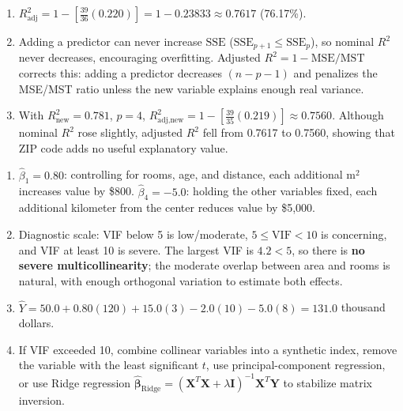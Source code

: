 \begin{solproblema}[prob:9f8863e]
\begin{enumerate}
\item $R_{\text{adj}}^2=1-\left[\frac{39}{36}(0.220)\right]=1-0.23833\approx0.7617$ (76.17\%).
\item Adding a predictor can never increase $\text{SSE}$ ($\text{SSE}_{p+1}\le\text{SSE}_p$), so nominal $R^2$ never decreases, encouraging overfitting. Adjusted $R^2=1-\text{MSE}/\text{MST}$ corrects this: adding a predictor decreases $(n-p-1)$ and penalizes the MSE/MST ratio unless the new variable explains enough real variance.
\item With $R^2_{\text{new}}=0.781$, $p=4$, $R_{\text{adj,new}}^2=1-\left[\frac{39}{35}(0.219)\right]\approx0.7560$. Although nominal $R^2$ rose slightly, adjusted $R^2$ fell from 0.7617 to 0.7560, showing that ZIP code adds no useful explanatory value.
\end{enumerate}
\end{solproblema}

\begin{solproblema}[prob:1d085e7]
\begin{enumerate}
\item $\hat\beta_1=0.80$: controlling for rooms, age, and distance, each additional m$^2$ increases value by \$800. $\hat\beta_4=-5.0$: holding the other variables fixed, each additional kilometer from the center reduces value by \$5,000.
\item Diagnostic scale: VIF below 5 is low/moderate, $5\le\text{VIF}<10$ is concerning, and VIF at least 10 is severe. The largest VIF is $4.2<5$, so there is \textbf{no severe multicollinearity}; the moderate overlap between area and rooms is natural, with enough orthogonal variation to estimate both effects.
\item $\hat Y=50.0+0.80(120)+15.0(3)-2.0(10)-5.0(8)=131.0$ thousand dollars.
\item If VIF exceeded 10, combine collinear variables into a synthetic index, remove the variable with the least significant $t$, use principal-component regression, or use Ridge regression $\hat{\boldsymbol\beta}_{\text{Ridge}}=(\mathbf X^T\mathbf X+\lambda\mathbf I)^{-1}\mathbf X^T\mathbf Y$ to stabilize matrix inversion.
\end{enumerate}
\end{solproblema}

